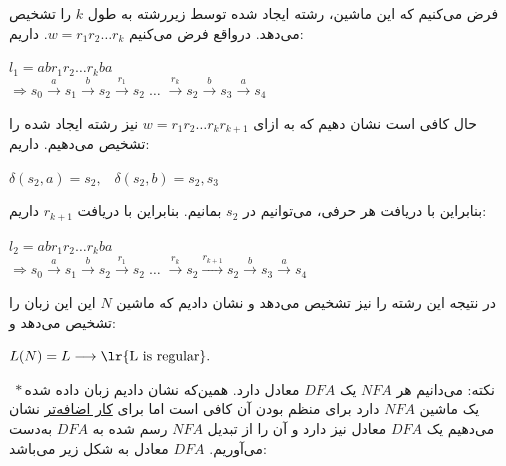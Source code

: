 \begin{enumerate}
\begin{enumerate}
    فرض می‌کنیم که این ماشین، رشته ایجاد شده توسط زیررشته به طول $k$ را تشخیص می‌دهد.
    درواقع فرض می‌کنیم $w = r_1r_2\ldots r_k$. داریم:\\[0.1in]
    \begin{center}
        $l_1 = abr_1r_2\ldots r_kba$\\[0.07in]
        $\Longrightarrow s_0 \xrightarrow{a} s_1 \xrightarrow{b}
        s_2 \xrightarrow{r_1} s_2 \; \ldots \; \xrightarrow{r_k}
        s_2 \xrightarrow{b} s_3 \xrightarrow{a} s_4
        $\\[0.1in]
    \end{center}
\end{enumerate}
حال کافی است نشان دهیم که به ازای $w = r_1r_2\ldots r_kr_{k+1}$ نیز رشته ایجاد شده را تشخیص می‌دهیم. داریم:
\begin{center}
    $\delta(s_2, a) = {s_2},\;\;\;\delta(s_2, b) = {s_2, s_3}$\\[0.1in]
\end{center}
بنابراین با دریافت هر حرفی، می‌توانیم در $s_2$ بمانیم. بنابراین با دریافت $r_{k+1}$ داریم:\\[0.05in]
\begin{center}
    $l_2 = abr_1r_2\ldots r_kba$\\[0.07in]
    $\Longrightarrow s_0 \xrightarrow{a} s_1 \xrightarrow{b}
    s_2 \xrightarrow{r_1} s_2 \; \ldots \; \xrightarrow{r_k}
    s_2 \xrightarrow{r_{k+1}} s_2 \xrightarrow{b} s_3 \xrightarrow{a} s_4
    $\\[0.1in]
\end{center}
در نتیجه این رشته را نیز تشخیص می‌دهد و نشان دادیم که ماشین $N$ این این زبان را تشخیص می‌دهد و:\\[0.1in]
\begin{center}
    $L(N) = L \longrightarrow \text{\lr{L is regular}}.$\\[0.15in]
\end{center}
$\;*$نکته: می‌دانیم هر $NFA$ یک $DFA$ معادل دارد. همین‌که نشان دادیم زبان داده شده یک ماشین $NFA$ دارد برای منظم بودن آن کافی است اما برای \underline{کار اضافه‌تر} نشان می‌دهیم یک $DFA$ معادل نیز دارد و آن را از تبدیل $NFA$ رسم شده به $DFA$ به‌دست می‌آوریم. $DFA$ معادل به شکل زیر می‌باشد:
\\[0.1in]
\begin{center}
\end{center}
\end{enumerate}
